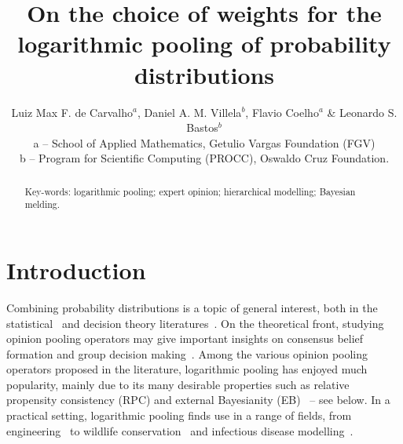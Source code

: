 \documentclass[a4paper, notitlepage, 10pt]{article}
\title{\vspace{-9ex}\centering \bf On the choice of weights for the logarithmic pooling of probability distributions}
\author{
Luiz Max F. de Carvalho$^{a}$, Daniel A. M. Villela$^b$, Flavio Coelho$^a$ \& Leonardo S. Bastos$^b$ \\
a -- School of Applied Mathematics, Getulio Vargas Foundation (FGV)\\
b -- Program for Scientific Computing (PROCC), Oswaldo Cruz Foundation. \\
}
\begin{document}
\maketitle

\begin{abstract}


Key-words: logarithmic pooling; expert opinion; hierarchical modelling; Bayesian melding. 
\end{abstract}

\section{Introduction}
\label{sec:intro}

Combining probability distributions is a topic of general interest, both in the statistical~\citep{West1984, Genest1986A, Genest1986B} and decision theory literatures~\citep{Genest1984,French1985,Guardoni2002}.
On the theoretical front, studying opinion pooling operators may give important insights on consensus belief formation and group decision making~\citep{West1984,Genest1986B,Guardoni2002}.
Among the various opinion pooling operators proposed in the literature, logarithmic pooling has enjoyed much popularity, mainly due to its many desirable properties such as relative propensity consistency (RPC) and external Bayesianity (EB)~\citep{Genest1986A} -- see below. 
In a practical setting, logarithmic pooling finds use in a range of fields, from engineering~\citep{Lind1988, Savchuk1994} to wildlife conservation~\citep{Poole2000} and infectious disease modelling~\citep{Coelho2009}. 
\end{document}
